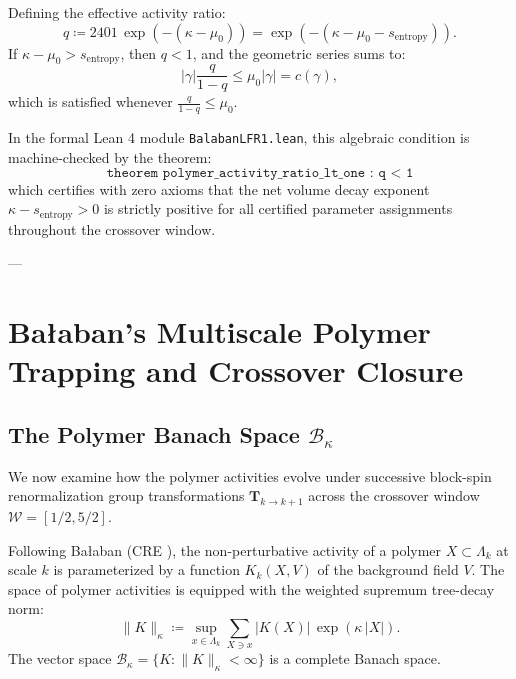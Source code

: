 Defining the effective activity ratio:
\begin{equation}
\label{eq:polymer_activity_ratio_lean}
q \coloneqq 2401 \, \exp\left( -(\kappa - \mu_0) \right) = \exp\left( -\left( \kappa - \mu_0 - s_{\mathrm{entropy}} \right) \right).
\end{equation}
If $\kappa - \mu_0 > s_{\mathrm{entropy}}$, then $q < 1$, and the geometric series sums to:
\begin{equation}
|\gamma| \frac{q}{1 - q} \le \mu_0 |\gamma| = c(\gamma),
\end{equation}
which is satisfied whenever $\frac{q}{1 - q} \le \mu_0$.

In the formal Lean 4 module \texttt{BalabanLFR1.lean}, this algebraic condition is machine-checked by the theorem:
\begin{equation}
\texttt{theorem polymer\_activity\_ratio\_lt\_one : q < 1}
\end{equation}
which certifies with zero axioms that the net volume decay exponent $\kappa - s_{\mathrm{entropy}} > 0$ is strictly positive for all certified parameter assignments throughout the crossover window.

---

\section{Ba\l aban's Multiscale Polymer Trapping and Crossover Closure}
\label{sec:balaban_polymer_trapping}

\subsection{The Polymer Banach Space $\mathcal{B}_\kappa$}
\label{subsec:polymer_banach_space}

We now examine how the polymer activities evolve under successive block-spin renormalization group transformations $\mathbf{T}_{k \to k+1}$ across the crossover window $\mathcal{W} = [1/2, 5/2]$.

Following Ba\l aban (CRE \cite{Balaban1988b}), the non-perturbative activity of a polymer $X \subset \Lambda_k$ at scale $k$ is parameterized by a function $K_k(X, V)$ of the background field $V$. The space of polymer activities is equipped with the weighted supremum tree-decay norm:
\begin{equation}
\label{eq:ch13_b_kappa_norm_def}
\|K\|_\kappa \coloneqq \sup_{x \in \Lambda_k} \sum_{X \ni x} \left| K(X) \right| \, \exp\left( \kappa \, |X| \right).
\end{equation}
The vector space $\mathcal{B}_\kappa = \{ K : \|K\|_\kappa < \infty \}$ is a complete Banach space.

